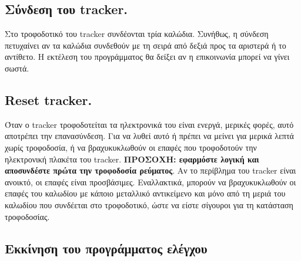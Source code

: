 \documentclass[
  a4paper,
  twoside,
  titlepage,
  11pt]{article}
\numberwithin{equation}{section}
\numberwithin{figure}{section}
\numberwithin{table}{section}
\begin{document}
\hypertarget{ux3c3ux3cdux3bdux3b4ux3b5ux3c3ux3b7-ux3c4ux3bfux3c5-tracker.}{%
\subsection*{Σύνδεση του tracker.}\label{ux3c3ux3cdux3bdux3b4ux3b5ux3c3ux3b7-ux3c4ux3bfux3c5-tracker.}}

\vspace{-0.6\baselineskip}

Στο τροφοδοτικό του tracker συνδέονται τρία καλώδια.
Συνήθως, η σύνδεση πετυχαίνει αν τα καλώδια συνδεθούν με τη σειρά από δεξιά προς τα αριστερά ή το αντίθετο.
Η εκτέλεση του προγράμματος θα δείξει αν η επικοινωνία μπορεί να γίνει σωστά.

\vspace{-1.05\baselineskip}

\hypertarget{reset-tracker.}{%
\subsection*{Reset tracker.}\label{reset-tracker.}}

\vspace{-0.6\baselineskip}

Όταν ο tracker τροφοδοτείται τα ηλεκτρονικά του είναι ενεργά, μερικές φορές, αυτό αποτρέπει την επανασύνδεση.
Για να λυθεί αυτό ή πρέπει να μείνει για μερικά λεπτά χωρίς τροφοδοσία, ή να βραχυκυκλωθούν οι επαφές που τροφοδοτούν την ηλεκτρονική πλακέτα του tracker.
\textbf{ΠΡΟΣΟΧΗ: εφαρμόστε λογική και αποσυνδέστε πρώτα την τροφοδοσία ρεύματος}.
Αν το περίβλημα του tracker είναι ανοικτό, οι επαφές είναι προσβάσιμες. Εναλλακτικά, μπορούν να βραχυκυκλωθούν οι επαφές του καλωδίου με κάποιο μεταλλικό αντικείμενο και μόνο από τη μεριά του καλωδίου που συνδέεται στο τροφοδοτικό, ώστε να είστε σίγουροι για τη κατάσταση τροφοδοσίας.

\vspace{-1.05\baselineskip}

\hypertarget{ux3b5ux3baux3baux3afux3bdux3b7ux3c3ux3b7-ux3c4ux3bfux3c5-ux3c0ux3c1ux3bfux3b3ux3c1ux3acux3bcux3bcux3b1ux3c4ux3bfux3c2-ux3b5ux3bbux3adux3b3ux3c7ux3bfux3c5}{%
\subsection*{Εκκίνηση του προγράμματος ελέγχου}\label{ux3b5ux3baux3baux3afux3bdux3b7ux3c3ux3b7-ux3c4ux3bfux3c5-ux3c0ux3c1ux3bfux3b3ux3c1ux3acux3bcux3bcux3b1ux3c4ux3bfux3c2-ux3b5ux3bbux3adux3b3ux3c7ux3bfux3c5}}
\end{document}
